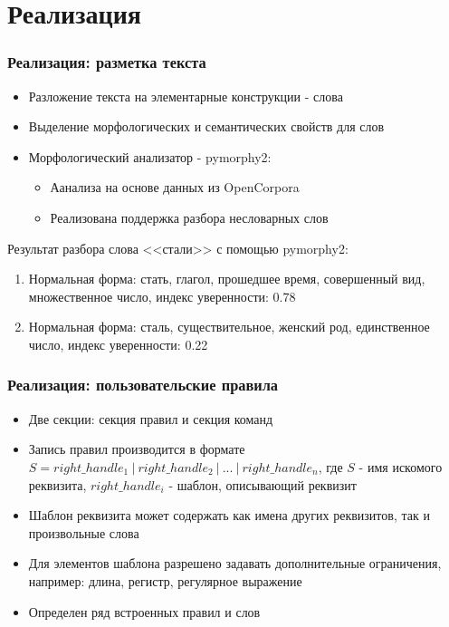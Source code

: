 \documentclass[10pt]{beamer}
\begin{document}
\section{Реализация}
\begin{frame}[fragile]
\frametitle{Реализация: разметка текста}
\begin{itemize}
	\item Разложение текста на элементарные конструкции - слова
	\item Выделение морфологических и семантических свойств для слов
	\item Морфологический анализатор - pymorphy2:
	\begin{itemize}
		\item Аанализа на основе данных из OpenCorpora
		\item Реализована поддержка разбора несловарных слов
	\end{itemize}
\end{itemize}
\begin{example}
Результат разбора слова <<стали>> с помощью pymorphy2:
\begin{enumerate}
	\item Нормальная форма: стать, глагол, прошедшее время, совершенный вид, множественное число, индекс уверенности: 0.78
	\item Нормальная форма: сталь, существительное, женский род, единственное число, индекс уверенности: 0.22
\end{enumerate}
\end{example}
\end{frame}

\begin{frame}
\frametitle{Реализация: пользовательские правила}
\begin{itemize}
	\item Две секции: секция правил и секция команд
	\item Запись правил производится в формате $S = right\_handle_1\ |\ right\_handle_2\ |\ ...\ |\ right\_handle_n$, где $S$ - имя искомого реквизита, $right\_handle_i$ - шаблон, описывающий реквизит
	\item Шаблон реквизита может содержать как имена других реквизитов, так и произвольные слова
	\item Для элементов шаблона разрешено задавать дополнительные ограничения, например: длина, регистр, регулярное выражение
	\item Определен ряд встроенных правил и слов
\end{itemize}
\end{frame}
\end{document}

